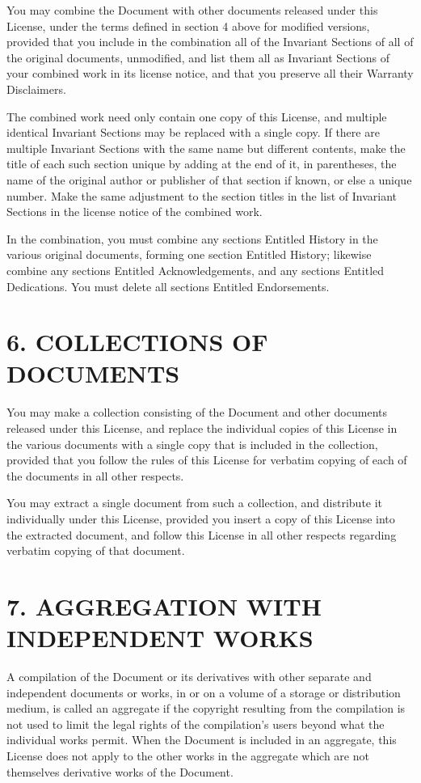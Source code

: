 \documentclass[captions=tableheading]{scrbook}
\begin{document}
You may combine the Document with other documents released under this License, under the terms defined in section 4 above for modified versions, provided that you include in the combination all of the Invariant Sections of all of the original documents, unmodified, and list them all as Invariant Sections of your combined work in its license notice, and that you preserve all their Warranty Disclaimers.

The combined work need only contain one copy of this License, and multiple identical Invariant Sections may be replaced with a single copy. If there are multiple Invariant Sections with the same name but different contents, make the title of each such section unique by adding at the end of it, in parentheses, the name of the original author or publisher of that section if known, or else a unique number. Make the same adjustment to the section titles in the list of Invariant Sections in the license notice of the combined work.

In the combination, you must combine any sections Entitled History in the various original documents, forming one section Entitled History;
likewise combine any sections Entitled Acknowledgements, and any sections Entitled Dedications. You must delete all sections Entitled Endorsements.
\section{6. COLLECTIONS OF DOCUMENTS}
\label{sec-18-7}


You may make a collection consisting of the Document and other documents released under this License, and replace the individual copies of this License in the various documents with a single copy that is included in the collection, provided that you follow the rules of this License for verbatim copying of each of the documents in all other respects. 

You may extract a single document from such a collection, and distribute it individually under this License, provided you insert a copy of this License into the extracted document, and follow this License in all other respects regarding verbatim copying of that document.
\section{7. AGGREGATION WITH INDEPENDENT WORKS}
\label{sec-18-8}


A compilation of the Document or its derivatives with other separate and independent documents or works, in or on a volume of a storage or distribution medium, is called an aggregate if the copyright resulting from the compilation is not used to limit the legal rights of the compilation's users beyond what the individual works permit. When the Document is included in an aggregate, this License does not apply to the other works in the aggregate which are not themselves derivative works of the Document.
\end{document}
